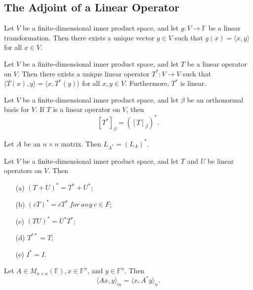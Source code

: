 \subsection{The Adjoint of a Linear Operator}
\begin{theorem}
    Let \(V\) be a finite-dimensional inner product space, and let \(g: V \to \mathbb{F}\) be a linear transformation. Then there exists a unique vector \(y \in V\) such that \(g(x) = \langle x, y \rangle\) for all \(x \in V\).
\end{theorem}
\vspace{5cm}
\begin{theorem}
    Let \(V\) be a finite-dimensional inner product space, and let \(T\) be a linear operator on \(V\). Then there exists a unique linear operator \(T^*: V \to V\) such that \(\langle T(x), y \rangle = \langle x, T^*(y) \rangle\) for all \(x, y \in V\). Furthermore, \(T^*\) is linear.
\end{theorem}
\vspace{7cm}
\begin{theorem}
    Let \(V\) be a finite-dimensional inner product space, and let \(\beta\) be an orthonormal basis for \(V\). If \(T\) is a linear operator on \(V\), then
    \[
    [T^*]_{\beta} = ([T]_{\beta})^*.
    \]
\end{theorem}
\vspace{2cm}
\begin{corollary}
    Let \(A\) be an \(n \times n \) matrix. Then \(L_{A^*} = (L_A)^*\).
\end{corollary}
\vspace{2cm}
\begin{theorem}
    Let \(V\) be a finite-dimensional inner product space, and let \(T\) and \(U\) be linear operators on \(V\). Then
    \begin{enumerate}
        \item[(a)] \((T + U)^* = T^* + U^*\);
        \item[(b)] \((cT)^* = \overline{c}T^*\ for\ any\ c \in F\);
        \item[(c)] \((TU)^* = U^*T^*\);
        \item[(d)] \(T^{**} = T\);
        \item[(e)] \(I^* = I\). 
    \end{enumerate}
\end{theorem}
\newpage
\begin{lemma}
    Let \(A \in M_{n \times n}(\mathbb{F}), x\in \mathbb{F}^n\), and \(y \in \mathbb{F}^n\). Then
    \[
    \langle Ax, y \rangle_m = \langle x, A^*y \rangle_n.
    \]
\end{lemma}
